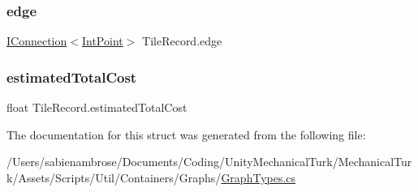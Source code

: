 \mbox{\label{struct_tile_record_acf607b02b02de7d586a00a75f341fe5e}} 
\subsubsection{\texorpdfstring{edge}{edge}}
{\footnotesize\ttfamily \mbox{\hyperlink{interface_i_connection}{I\+Connection}}$<$\mbox{\hyperlink{struct_int_point}{Int\+Point}}$>$ Tile\+Record.\+edge}

\mbox{\label{struct_tile_record_ab2f27c5059450f78975ed349cd671b70}} 
\subsubsection{\texorpdfstring{estimated\+Total\+Cost}{estimatedTotalCost}}
{\footnotesize\ttfamily float Tile\+Record.\+estimated\+Total\+Cost}



The documentation for this struct was generated from the following file\+:\begin{DoxyCompactItemize}
\item 
/\+Users/sabienambrose/\+Documents/\+Coding/\+Unity\+Mechanical\+Turk/\+Mechanical\+Turk/\+Assets/\+Scripts/\+Util/\+Containers/\+Graphs/\mbox{\hyperlink{_graph_types_8cs}{Graph\+Types.\+cs}}\end{DoxyCompactItemize}

